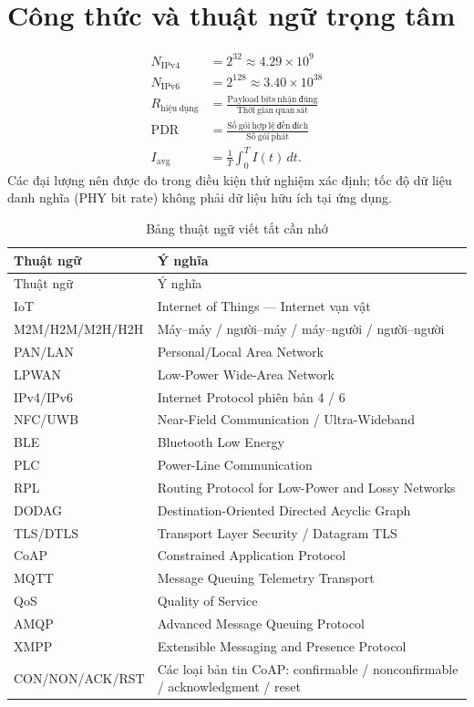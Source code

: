 \section{Công thức và thuật ngữ trọng tâm}
\begin{align}
N_{\mathrm{IPv4}}&=2^{32}\approx4.29\times 10^{9}\\
N_{\mathrm{IPv6}}&=2^{128}\approx3.40\times10^{38}\\
R_{\mathrm{hiệu\ dụng}}&=\frac{\mathrm{Payload\ bits\ nhận\ đúng}}{\mathrm{Thời\ gian\ quan\ sát}}\\
\mathrm{PDR}&=\frac{\mathrm{Số\ gói\ hợp\ lệ\ đến\ đích}}{\mathrm{Số\ gói\ phát}}\\
I_{\mathrm{avg}}&=\frac{1}{T}\int_0^T I(t)\,dt.
\end{align}
\noindent Các đại lượng nên được đo trong điều kiện thử nghiệm xác định; tốc độ dữ liệu danh nghĩa (PHY bit rate) không phải dữ liệu hữu ích tại ứng dụng.
\begin{longtable}{@{}p{32mm}p{103mm}@{}}
\caption{Bảng thuật ngữ viết tắt cần nhớ}\\\toprule
Thuật ngữ & Ý nghĩa\\\midrule\endfirsthead
\toprule Thuật ngữ & Ý nghĩa\\\midrule\endhead
IoT & Internet of Things — Internet vạn vật\\
M2M/H2M/M2H/H2H & Máy--máy / người--máy / máy--người / người--người\\
PAN/LAN & Personal/Local Area Network\\
LPWAN & Low-Power Wide-Area Network\\
IPv4/IPv6 & Internet Protocol phiên bản 4 / 6\\
NFC/UWB & Near-Field Communication / Ultra-Wideband\\
BLE & Bluetooth Low Energy\\
PLC & Power-Line Communication\\
RPL & Routing Protocol for Low-Power and Lossy Networks\\
DODAG & Destination-Oriented Directed Acyclic Graph\\
TLS/DTLS & Transport Layer Security / Datagram TLS\\
CoAP & Constrained Application Protocol\\
MQTT & Message Queuing Telemetry Transport\\
QoS & Quality of Service\\
AMQP & Advanced Message Queuing Protocol\\
XMPP & Extensible Messaging and Presence Protocol\\
CON/NON/ACK/RST & Các loại bản tin CoAP: confirmable / nonconfirmable / acknowledgment / reset\\
\bottomrule
\end{longtable}
